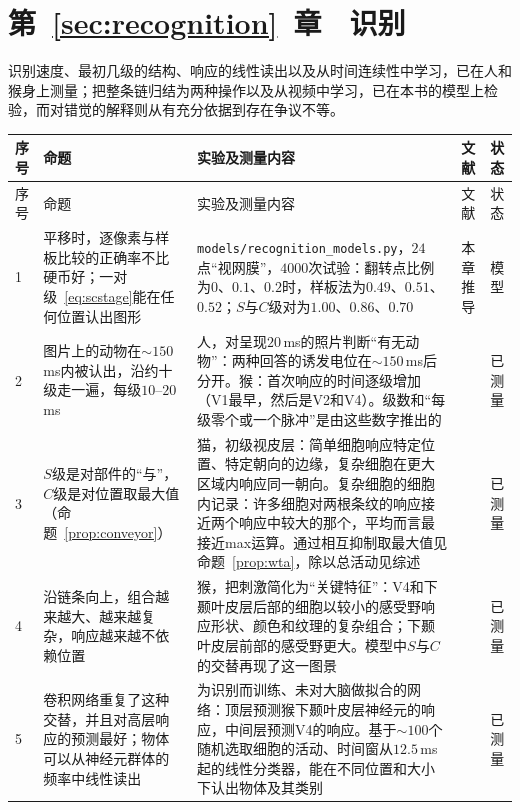 \section{第~\ref{sec:recognition}~章　识别}

识别速度、最初几级的结构、响应的线性读出以及从时间连续性中学习，已在人和猴身上测量；把整条链归结为两种操作以及从视频中学习，已在本书的模型上检验，而对错觉的解释则从有充分依据到存在争议不等。

{\footnotesize
\setlength{\tabcolsep}{3pt}\renewcommand{\arraystretch}{1.15}
\begin{longtable}{>{\raggedright}p{0.5cm}>{\raggedright}p{4.0cm}>{\raggedright}p{5.6cm}>{\raggedright}p{2.3cm}>{\raggedright\arraybackslash}p{1.7cm}}
\toprule
序号 & 命题 & 实验及测量内容 & 文献 & 状态 \\
\midrule\endfirsthead
\toprule
序号 & 命题 & 实验及测量内容 & 文献 & 状态 \\
\midrule\endhead
1 & 平移时，逐像素与样板比较的正确率不比硬币好；一对级~\eqref{eq:scstage}能在任何位置认出图形 & \texttt{models/\allowbreak recognition\_models.py}，$24$点“视网膜”，$4000$次试验：翻转点比例为$0$、$0.1$、$0.2$时，样板法为$0.49$、$0.51$、$0.52$；$S$与$C$级对为$1.00$、$0.86$、$0.70$ & 本章推导 & 模型 \\
2 & 图片上的动物在$\sim150$\,ms内被认出，沿约十级走一遍，每级$10$--$20$\,ms & 人，对呈现$20$\,ms的照片判断“有无动物”：两种回答的诱发电位在$\sim150$\,ms后分开。猴：首次响应的时间逐级增加（V1最早，然后是V2和V4）。级数和“每级零个或一个脉冲”是由这些数字推出的 & \cite{Thorpe1996,Schmolesky1998} & 已测量 \\
3 & $S$级是对部件的“与”，$C$级是对位置取最大值（命题~\ref{prop:conveyor}） & 猫，初级视皮层：简单细胞响应特定位置、特定朝向的边缘，复杂细胞在更大区域内响应同一朝向。复杂细胞的细胞内记录：许多细胞对两根条纹的响应接近两个响应中较大的那个，平均而言最接近max运算。通过相互抑制取最大值见命题~\ref{prop:wta}，除以总活动见综述 & \cite{HubelWiesel1962,Lampl2004,Carandini2012} & 已测量 \\
4 & 沿链条向上，组合越来越大、越来越复杂，响应越来越不依赖位置 & 猴，把刺激简化为“关键特征”：V4和下颞叶皮层后部的细胞以较小的感受野响应形状、颜色和纹理的复杂组合；下颞叶皮层前部的感受野更大。模型中$S$与$C$的交替再现了这一图景 & \cite{KobatakeTanaka1994,Riesenhuber1999} & 已测量 \\
5 & 卷积网络重复了这种交替，并且对高层响应的预测最好；物体可以从神经元群体的频率中线性读出 & 为识别而训练、未对大脑做拟合的网络：顶层预测猴下颞叶皮层神经元的响应，中间层预测V4的响应。基于$\sim100$个随机选取细胞的活动、时间窗从$12.5$\,ms起的线性分类器，能在不同位置和大小下认出物体及其类别 & \cite{Fukushima1980,Yamins2014,Hung2005} & 已测量 \\

\end{longtable}}
